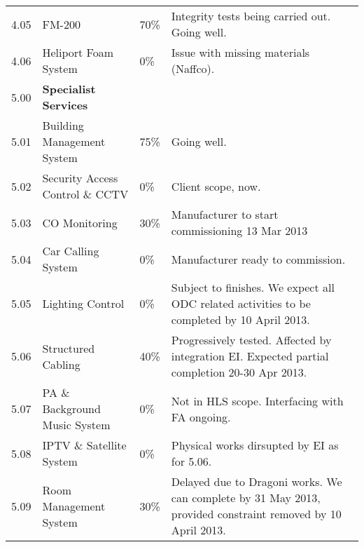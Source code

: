 {\begin{longtable}{lllp{5.3cm}@{}}
4.05	&FM-200		&70\%&Integrity tests being carried out. Going well. \\

4.06	&Heliport Foam System	 &0\%&Issue with missing materials (Naffco).\\	
\midrule
5.00	&\textbf{Specialist Services}		&&\\
5.01	&Building Management System	&75\%& Going well.\\	
5.02	&Security Access Control \& CCTV	&0\%&Client scope, now.\\	
5.03	&CO Monitoring		& 30\%&Manufacturer to start commissioning 13 Mar 2013 \\
5.04	&Car Calling System	&0\%&Manufacturer ready to commission.\\

5.05	&Lighting Control		&0\%&Subject to finishes. We expect all ODC related activities to be completed by 10 April 2013.\\

5.06	&Structured Cabling		&40\%&Progressively tested. Affected by integration EI. Expected partial completion 20-30 Apr 2013.\\

5.07	&PA \& Background Music System &0\%& Not in HLS scope. Interfacing with  FA ongoing.\\		
5.08	&IPTV \& Satellite System	&0\%&Physical works dirsupted by EI as for 5.06.\\	
5.09	&Room Management System	&30\%&Delayed due to Dragoni works. We can complete by 31 May 2013, provided constraint removed by 10 April 2013.\\

\bottomrule
\end{longtable}
}


